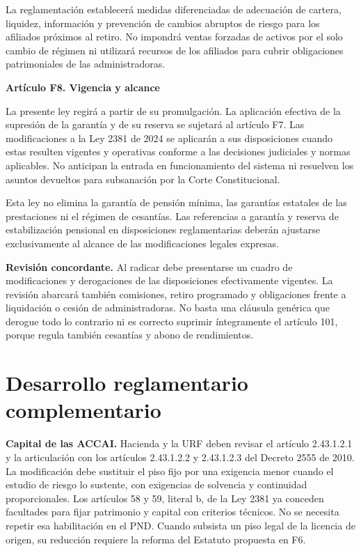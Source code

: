 La reglamentación establecerá medidas diferenciadas de adecuación de cartera, liquidez, información y prevención de cambios abruptos de riesgo para los afiliados próximos al retiro. No impondrá ventas forzadas de activos por el solo cambio de régimen ni utilizará recursos de los afiliados para cubrir obligaciones patrimoniales de las administradoras.

\textbf{Artículo F8. Vigencia y alcance}\par\nobreak

La presente ley regirá a partir de su promulgación. La aplicación efectiva de la supresión de la garantía y de su reserva se sujetará al artículo F7. Las modificaciones a la Ley 2381 de 2024 se aplicarán a sus disposiciones cuando estas resulten vigentes y operativas conforme a las decisiones judiciales y normas aplicables. No anticipan la entrada en funcionamiento del sistema ni resuelven los asuntos devueltos para subsanación por la Corte Constitucional.

Esta ley no elimina la garantía de pensión mínima, las garantías estatales de las prestaciones ni el régimen de cesantías. Las referencias a garantía y reserva de estabilización pensional en disposiciones reglamentarias deberán ajustarse exclusivamente al alcance de las modificaciones legales expresas.

\textbf{Revisión concordante.} Al radicar debe presentarse un cuadro de modificaciones y derogaciones de las disposiciones efectivamente vigentes. La revisión abarcará también comisiones, retiro programado y obligaciones frente a liquidación o cesión de administradoras. No basta una cláusula genérica que derogue todo lo contrario ni es correcto suprimir íntegramente el artículo 101, porque regula también cesantías y abono de rendimientos.

\section*{Desarrollo reglamentario complementario}

\textbf{Capital de las ACCAI.} Hacienda y la URF deben revisar el artículo 2.43.1.2.1 y la articulación con los artículos 2.43.1.2.2 y 2.43.1.2.3 del Decreto 2555 de 2010. La modificación debe sustituir el piso fijo por una exigencia menor cuando el estudio de riesgo lo sustente, con exigencias de solvencia y continuidad proporcionales. Los artículos 58 y 59, literal b, de la Ley 2381 ya conceden facultades para fijar patrimonio y capital con criterios técnicos. No se necesita repetir esa habilitación en el PND. Cuando subsista un piso legal de la licencia de origen, su reducción requiere la reforma del Estatuto propuesta en F6.

